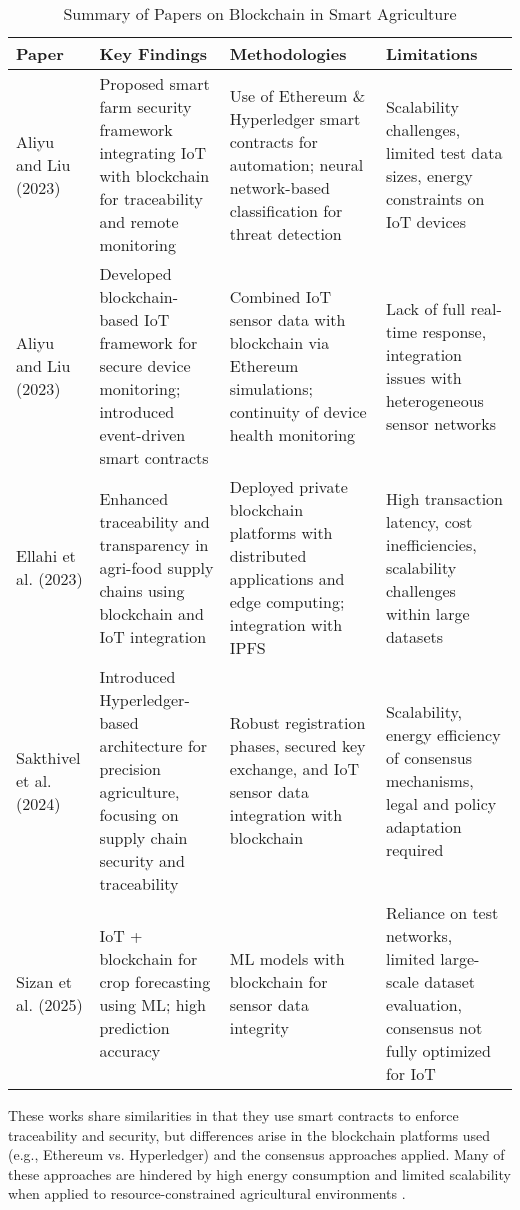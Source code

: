\documentclass[12pt,onecolumn]{IEEEtran} %
\newcommand{\fitToPage}[1]{\begin{adjustbox}{max width=\textwidth}#1\end{adjustbox}}
\renewcommand{\arraystretch}{1.2} %
\begin{document}
\begin{table}[H]
\caption{Summary of Papers on Blockchain in Smart Agriculture}
\label{table1}
\centering
\fitToPage{
\begingroup
\setlength{\tabcolsep}{4pt}
\renewcommand{\arraystretch}{1.15}
\footnotesize
\begin{tabularx}{\textwidth}{@{}P{0.18\textwidth}YYY@{}}
\toprule
\textbf{Paper} & \textbf{Key Findings} & \textbf{Methodologies} & \textbf{Limitations} \\
\midrule
Aliyu and Liu (2023) & Proposed smart farm security framework integrating IoT with blockchain for traceability and remote monitoring & Use of Ethereum \& Hyperledger smart contracts for automation; neural network-based classification for threat detection & Scalability challenges, limited test data sizes, energy constraints on IoT devices \\
\addlinespace
Aliyu and Liu (2023) & Developed blockchain-based IoT framework for secure device monitoring; introduced event-driven smart contracts & Combined IoT sensor data with blockchain via Ethereum simulations; continuity of device health monitoring & Lack of full real-time response, integration issues with heterogeneous sensor networks \\
\addlinespace
Ellahi et al. (2023) & Enhanced traceability and transparency in agri-food supply chains using blockchain and IoT integration & Deployed private blockchain platforms with distributed applications and edge computing; integration with IPFS & High transaction latency, cost inefficiencies, scalability challenges within large datasets \\
\addlinespace
Sakthivel et al. (2024) & Introduced Hyperledger-based architecture for precision agriculture, focusing on supply chain security and traceability & Robust registration phases, secured key exchange, and IoT sensor data integration with blockchain & Scalability, energy efficiency of consensus mechanisms, legal and policy adaptation required \\
\addlinespace
Sizan et al. (2025) & IoT + blockchain for crop forecasting using ML; high prediction accuracy & ML models with blockchain for sensor data integrity & Reliance on test networks, limited large-scale dataset evaluation, consensus not fully optimized for IoT \\
\bottomrule
\end{tabularx}
\endgroup
}
\end{table}

These works share similarities in that they use smart contracts to enforce traceability and security, but differences arise in the blockchain platforms used (e.g., Ethereum vs. Hyperledger) and the consensus approaches applied. Many of these approaches are hindered by high energy consumption and limited scalability when applied to resource-constrained agricultural environments \cite{aliyu2023blockchainbasedsmartfarm, ellahi2023blockchainbasedframeworksfor}.
\end{document}
